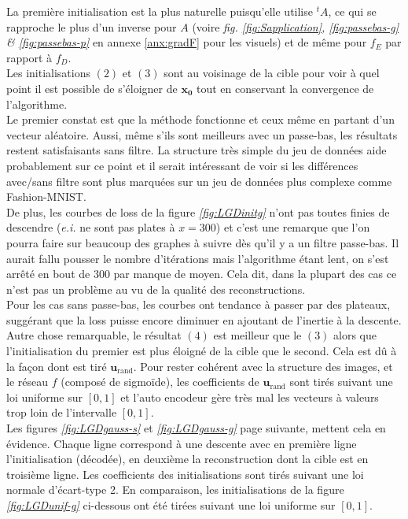 \documentclass[hidelinks, french]{article} %
\newcommand{\ei}{\textit{e.i. }}
\renewcommand{\bf}[1]{\boldsymbol{#1}}
\theoremstyle{enonce}
\theoremstyle{special}
\theoremstyle{rq}
\theoremstyle{exo}
\theoremstyle{demo}
\begin{document}
\noindent La première initialisation est la plus naturelle puisqu'elle utilise $^tA$, ce qui se rapproche le plus d'un inverse pour $A$ (voire \textit{fig. \ref{fig:Sapplication}, \ref{fig:passebas-g} \& \ref{fig:passebas-p}} en annexe \ref{anx:gradF} pour les visuels) et de même pour $f_E$ par rapport à $f_D$.
\\
Les initialisations $(2)$ et $(3)$ sont au voisinage de la cible pour voir à quel point il est possible de s'éloigner de $\bf{x_0}$ tout en conservant la convergence de l'algorithme.
\\

Le premier constat est que la méthode fonctionne et ceux même en partant d'un vecteur aléatoire.  Aussi, même s'ils sont meilleurs avec un passe-bas, les résultats restent satisfaisants sans filtre. La structure très simple du jeu de données aide probablement sur ce point et il serait intéressant de voir si les différences avec/sans filtre sont plus marquées sur un jeu de données plus complexe comme Fashion-MNIST.
\\
De plus, les courbes de loss de la figure \textit{\ref{fig:LGDinitg}} n'ont pas toutes finies de descendre (\ei ne sont pas plates à $x=300$) et c'est une remarque que l'on pourra faire sur beaucoup des graphes à suivre dès qu'il y a un filtre passe-bas. Il aurait fallu pousser le nombre d'itérations mais l'algorithme étant lent, on s'est arrêté en bout de 300 par manque de moyen. Cela dit, dans la plupart des cas ce n'est pas un problème au vu de la qualité des reconstructions.
\\
Pour les cas sans passe-bas, les courbes ont tendance à passer par des plateaux, suggérant que la loss puisse encore diminuer en ajoutant de l’inertie à la descente.
\\

Autre chose remarquable, le résultat $(4)$ est meilleur que le $(3)$ alors que l'initialisation du premier est plus éloigné de la cible que le second. Cela est dû à la façon dont est tiré $\bf{u}_{\text{rand}}$. Pour rester cohérent avec la structure des images, et le réseau $f$ (composé de sigmoïde), les coefficients de $\bf{u}_{\text{rand}}$ sont tirés suivant une loi uniforme sur $[0,1]$ et l'auto encodeur gère très mal les vecteurs à valeurs trop loin de l'intervalle $[0,1]$.
\\
Les figures \textit{\ref{fig:LGDgauss-s}} et \textit{\ref{fig:LGDgauss-g}} page suivante, mettent cela en évidence. Chaque ligne correspond à une descente avec en première ligne l'initialisation (décodée), en deuxième la reconstruction dont la cible est en troisième ligne. Les coefficients des initialisations sont tirés suivant une loi normale d'écart-type 2. En comparaison, les initialisations de la figure \textit{\ref{fig:LGDunif-g}} ci-dessous ont été tirées suivant une loi uniforme sur $[0,1]$.
\end{document}
